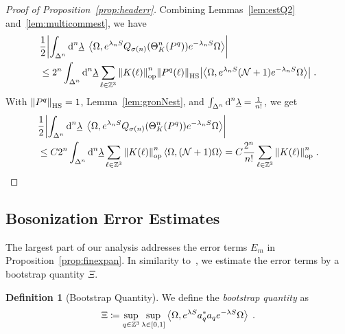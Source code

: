 \documentclass[12pt,a4paper]{article}
\numberwithin{equation}{section}
\newcommand{\ulambda}{\underline{\lambda}}
\newcommand{\1}{\mathbb{I}}
\newcommand{\di}{\textnormal{d}}
\newcommand{\HS}{\mathrm{HS}}
\newcommand{\Zstar}{\mathbb{Z}^3} %
\newcommand{\Z}{\mathbb{Z}}
\newcommand{\NN}{\mathcal{N}}
\newcommand{\half}{\frac{1}{2}}
\newcommand{\eva}[1]{\left\langle #1 \right\rangle}
\theoremstyle{plain}
\theoremstyle{definition}
\newtheorem{definition}[theorem]{Definition}
\theoremstyle{remark}
\theoremstyle{plain}
\theoremstyle{definition}
\theoremstyle{remark}
\begin{document}
\begin{proof}[Proof of Proposition~\ref{prop:headerr}]
Combining Lemmas~\ref{lem:estQ2} and~\ref{lem:multicommest}, we have
\begin{align}
	&\half \abs{\int_{\Delta^n} \di^n \ulambda \;
		\eva{\Omega, e^{\lambda_n S} Q_{\sigma(n)}(\Theta^n_{K}(P^q)) e^{-\lambda_n S} \Omega} } \nonumber\\
	&\leq 2^n \int_{\Delta^n} \di^n \ulambda \sum_{\ell \in \Zstar} \norm{K(\ell)}^n_{\mathrm{op}} \norm{P^q(\ell)}_{\HS} 
		\abs{\eva{\Omega, e^{\lambda_n S} (\NN +1) e^{-\lambda_n S} \Omega}} \;.
\end{align}
With $ \norm{P^q}_{\HS} = 1$, Lemma~\ref{lem:gronNest}, and $ \int_{\Delta^n} \di^n\underline{\lambda} = \frac{1}{n!} $, we get
\begin{align*}
	&\half \abs{\int_{\Delta^n} \di^n \ulambda \;
		\eva{\Omega, e^{\lambda_n S} Q_{\sigma(n)}(\Theta^n_{K}(P^q)) e^{-\lambda_n S} \Omega} }
	\\
	& \leq C 2^n \int_{\Delta^n} \di^n \ulambda \sum_{\ell \in \Zstar} \norm{K(\ell)}^n_{\mathrm{op}} \eva{\Omega,(\NN+1)\Omega} =  C \frac{2^n}{n!} \sum_{\ell \in \Zstar} \norm{K(\ell)}^n_{\mathrm{op}} \;. \qedhere
\end{align*}
\end{proof}






\subsection{Bosonization Error Estimates}
\label{subsec:bos_error}

The largest part of our analysis addresses the error terms $ E_m $ in Proposition~\ref{prop:finexpan}. In similarity to~\cite{BL25}, we estimate the error terms by a  bootstrap quantity $ \Xi $.

\begin{definition}[Bootstrap Quantity] We define the \emph{bootstrap quantity} as
\begin{equation} \label{eq:Xi}
	\Xi \coloneq \sup\limits_{q \in \Z^3} \sup\limits_{\lambda \in [0,1]}\expval{\Omega, e^{\lambda S} a^*_q a_q e^{-\lambda S} \Omega} \;.
\end{equation}
\end{definition}
\end{document}
